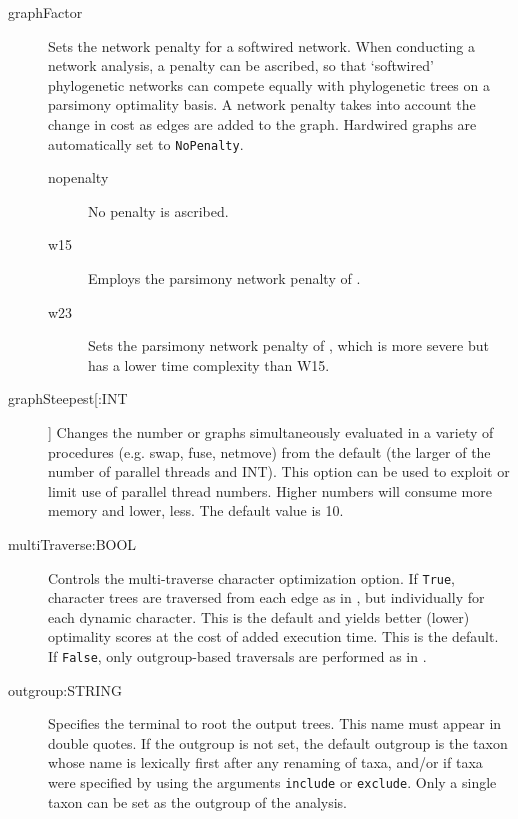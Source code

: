 \begin{description}
		\item[graphFactor] Sets the network penalty for a softwired network. When conducting 
		a network analysis, a penalty can be ascribed, so that ‘softwired’ phylogenetic networks 
		can compete equally with phylogenetic trees on a parsimony optimality basis. A network 
		penalty takes into account the change in cost as edges are added to the graph. Hardwired 
		graphs are automatically set to \texttt{NoPenalty}.
			
		\begin{description}
			
			\item[nopenalty] No penalty is ascribed.	

			\item[w15] Employs the parsimony network penalty of \cite{Wheeler2015}.	
		
			\item[w23] Sets the parsimony network penalty of \cite{WheelerandWashburn2023}, 
			which is more severe
			but has a lower time complexity than W15.
			
		\end{description}
			
		\item[graphSteepest[:INT]] Changes the number or graphs simultaneously evaluated 
		in a variety of procedures (e.g. swap, fuse, netmove) from the default (the larger of the 
		number of parallel threads and INT).  This option can be used to exploit or limit use 
		of parallel thread numbers.  Higher numbers will consume more memory and lower, less.
		The default value is 10.  
		
		
		\item[multiTraverse:BOOL] Controls the multi-traverse character optimization option. 
		If \texttt{True}, character trees are traversed from each edge as in 
		\citep{VaronandWheeler2012,VaronandWheeler2013, POY4, POY5}, but individually 
		for each dynamic character. This is the default and yields better (lower) optimality 
		scores at the cost of added execution time. This is the default.
		If \texttt{False}, only outgroup-based traversals are performed as in 
		\citep{Wheeler1996, POY2, POY3}. 
		
			
		\item[outgroup:STRING] Specifies the terminal to root the output trees. 
		This name must appear in double quotes. If the outgroup is not set, the 
		default outgroup is the taxon whose name is lexically first after any renaming 
		of taxa, and/or if taxa were specified by using the arguments \texttt{include} 
		or \texttt{exclude}. Only a single taxon can be set as the outgroup of the analysis. 
			

\end{description}
